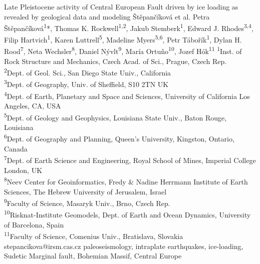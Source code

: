 \abstract
{Late Pleistocene activity of Central European Fault driven by ice loading as revealed by geological data and modeling} 
{Štěpančíková et al.} 
{Petra Štěpančíková\textsuperscript{1}*, Thomas K. Rockwell\textsuperscript{1,2}, Jakub Stemberk\textsuperscript{1}, Edward J. Rhodes\textsuperscript{3,4}, Filip Hartvich\textsuperscript{1}, Karen Luttrell\textsuperscript{5}, Madeline Myers\textsuperscript{5,6}, Petr Tábořík\textsuperscript{1}, Dylan H. Rood\textsuperscript{7}, Neta Wechsler\textsuperscript{8}, Daniel Nývlt\textsuperscript{9}, María Ortuño\textsuperscript{10}, Jozef Hók\textsuperscript{11}} 
{\TLtag} 
{
	\textsuperscript{1}Inst. of Rock Structure and Mechanics, Czech Acad. of Sci., Prague, Czech Rep.\\
	\textsuperscript{2}Dept. of Geol. Sci., San Diego State Univ., California\\
	\textsuperscript{3}Dept. of Geography, Univ. of Sheffield, S10 2TN UK\\
	\textsuperscript{4}Dept. of Earth, Planetary and Space and Sciences, University of California Los Angeles, CA, USA\\
	\textsuperscript{5}Dept. of Geology and Geophysics, Louisiana State Univ., Baton Rouge, Louisiana\\
	\textsuperscript{6}Dept. of Geography and Planning, Queen’s University, Kingston, Ontario, Canada\\
	\textsuperscript{7}Dept. of Earth Science and Engineering, Royal School of Mines, Imperial College London, UK\\
	\textsuperscript{8}Neev Center for Geoinformatics, Fredy \& Nadine Herrmann Institute of Earth Sciences, The Hebrew University of Jerusalem, Israel\\
	\textsuperscript{9}Faculty of Science, Masaryk Univ., Brno, Czech Rep.\\
	\textsuperscript{10}Risknat-Institute Geomodels, Dept. of Earth and Ocean Dynamics, University of Barcelona, Spain\\
	\textsuperscript{11}Faculty of Science, Comenius Univ., Bratislava, Slovakia  
}
{stepancikova@irsm.cas.cz}  %
{paleoseismology, intraplate earthquakes, ice-loading, Sudetic Marginal fault, Bohemian Massif, Central Europe}
